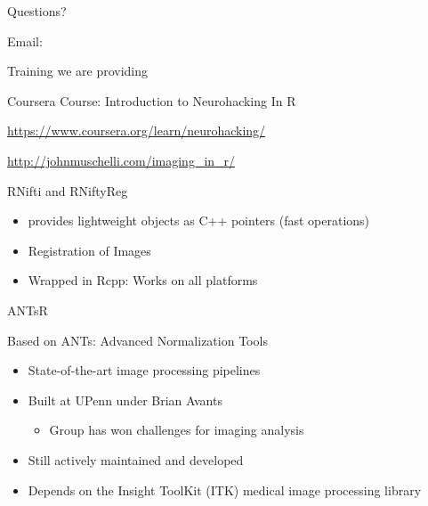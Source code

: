 \documentclass[ignorenonframetext,]{beamer}
\providecommand{\tightlist}{%
  \setlength{\itemsep}{0pt}\setlength{\parskip}{0pt}}
\begin{document}
\begin{frame}{Questions?}
\protect\hypertarget{questions}{}

Email:

\end{frame}

\begin{frame}{Training we are providing}
\protect\hypertarget{training-we-are-providing}{}

Coursera Course: Introduction to Neurohacking In R

 \url{https://www.coursera.org/learn/neurohacking/}

\url{http://johnmuschelli.com/imaging_in_r/}

\end{frame}

\begin{frame}{RNifti and RNiftyReg}
\protect\hypertarget{rnifti-and-rniftyreg}{}

\begin{itemize}
\tightlist
\item
  provides lightweight objects as C++ pointers (fast operations)
\item
  Registration of Images
\item
  Wrapped in Rcpp: Works on all platforms
\end{itemize}

\end{frame}

\begin{frame}{ANTsR}
\protect\hypertarget{antsr}{}

Based on ANTs: Advanced Normalization Tools

\begin{itemize}
\tightlist
\item
  State-of-the-art image processing pipelines
\item
  Built at UPenn under Brian Avants

  \begin{itemize}
  \tightlist
  \item
    Group has won challenges for imaging analysis
  \end{itemize}
\item
  Still actively maintained and developed
\item
  Depends on the Insight ToolKit (ITK) medical image processing library
\end{itemize}

\end{frame}
\end{document}
